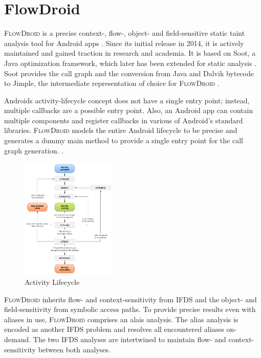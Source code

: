 \documentclass[../draft.tex]{subfiles}
\begin{document}
    \section{FlowDroid}\label{s:flowdroid}
    \textsc{FlowDroid} is a precise context-, flow-, object- and field-sensitive static taint analysis tool for Android apps \cite{Arzt2014}.
    Since its initial release in 2014, it is actively maintained and gained traction in research and academia\footnotemark{}.
    It is based on Soot, a Java optimization framework, which later has been extended for static analysis \cite{Lam2011}.
    Soot provides the call graph and the conversion from Java and Dalvik bytecode to Jimple, the intermediate representation of choice for \textsc{FlowDroid} \cite{Arzt2017PhD}.

    Androids activity-lifecycle concept does not have a single entry point; instead, multiple callbacks are a possible entry point.
    Also, an Android app can contain multiple components and register callbacks in various of Android's standard libraries.
    \textsc{FlowDroid} models the entire Android lifecycle to be precise and generates a dummy main method to provide a single entry point for the call graph generation.
    \cite{Arzt2014}.

    \begin{figure}[tbp]
        \centering
        \includegraphics[width=0.4\textwidth]{figs/activity_lifecycle.png}
        \caption{Activity Lifecycle\protect\footnotemark}
        \label{f:activity}
    \end{figure}

    \textsc{FlowDroid} inherits flow- and context-sensitivity from IFDS and the object- and field-sensitivity from symbolic access paths. To provide precise results even with aliases in use, \textsc{FlowDroid} comprises an alais analysis. The alias analysis is encoded as another IFDS problem and resolves all encountered aliases on-demand. The two IFDS analyses are intertwined to maintain flow- and context-sensitivity between both analyses\cite{Arzt2014}.
\end{document}
